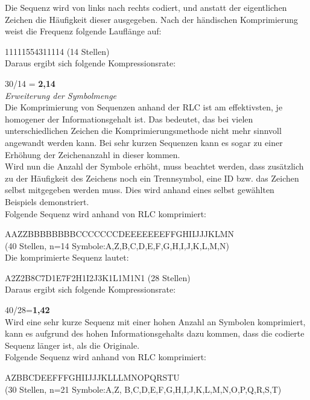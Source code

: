 \documentclass[12pt,german]{article}
\begin{document}
Die Sequenz wird von links nach rechts codiert, und anstatt der eigentlichen Zeichen die Häufigkeit dieser ausgegeben. Nach der händischen Komprimierung weist die Frequenz folgende Lauflänge auf:

11111554311114 (14 Stellen)\\


Daraus ergibt sich folgende Kompressionsrate:

30/14 = \textbf{ 2,14}\\

\textit{Erweiterung der Symbolmenge}\\
Die Komprimierung von Sequenzen anhand der RLC ist am effektivsten, je homogener der Informationsgehalt ist. Das bedeutet, das bei vielen unterschiedlichen Zeichen die Komprimierungsmethode nicht mehr sinnvoll angewandt werden kann. Bei sehr kurzen Sequenzen kann es sogar zu einer Erhöhung der Zeichenanzahl in dieser kommen.\\

Wird nun die Anzahl der Symbole erhöht, muss beachtet werden, dass zusätzlich zu der Häufigkeit des Zeichens noch ein Trennsymbol, eine ID bzw. das Zeichen selbst mitgegeben werden muss. Dies wird anhand eines selbst gewählten Beispiels demonstriert.\\

Folgende Sequenz wird anhand von RLC komprimiert:

AAZZBBBBBBBBCCCCCCCDEEEEEEEFFGHIIJJJKLMN\\ (40 Stellen, n=14 Symbole:A,Z,B,C,D,E,F,G,H,I,J,K,L,M,N)\\

Die komprimierte Sequenz lautet:

A2Z2B8C7D1E7F2H1I2J3K1L1M1N1 (28 Stellen)\\

Daraus ergibt sich folgende Kompressionsrate:

40/28=\textbf{1,42}\\

Wird eine sehr kurze Sequenz mit einer hohen Anzahl an Symbolen komprimiert, kann es aufgrund des hohen Informationsgehalts dazu kommen, dass die codierte Sequenz länger ist, als die Originale.\\


Folgende Sequenz wird anhand von RLC komprimiert:

AZBBCDEEFFFGHIIJJJKLLLMNOPQRSTU\\ (30 Stellen, n=21 Symbole:A,Z, B,C,D,E,F,G,H,I,J,K,L,M,N,O,P,Q,R,S,T)\\
\end{document}
